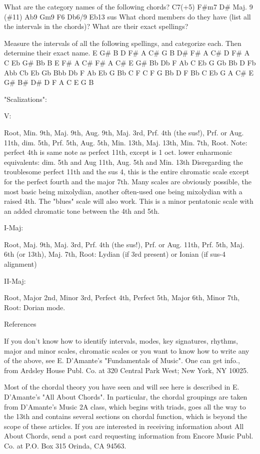 What are the category names of the following chords?
C7(+5) F\#m7 D\# Maj. 9 (\#11) Ab9 Gm9 F6 Db6/9 Eb13 sus
What chord members do they have (list all the intervals in the chords)?
What are their exact spellings?

Measure the intervals of all the following spellings, and categorize each.
Then determine their exact name.
E G\# B D F\# A C\#
G B D\# F\# A C\#
D F\# A C Eb G\# Bb
B E F\# A C\#
F\# A C\# E G\#
Bb Db F Ab C Eb G
Gb Bb D Fb Abb
Cb Eb Gb Bbb Db F Ab
Eb G Bb C F
C F G Bb D
F Bb C Eb G
A C\# E G\# B\# D\#
D F A C E G B

"Scalizations":

V:

Root, Min. 9th, Maj. 9th, Aug. 9th, Maj. 3rd, Prf. 4th (the sus!), 
Prf. or Aug. 11th, dim. 5th, Prf. 5th, Aug. 5th, Min. 13th, Maj. 13th,
Min. 7th, Root.
Note: perfect 4th is same note as perfect 11th, except is 1 oct. lower
      enharmonic equivalents: dim. 5th and Aug 11th, 
                              Aug. 5th and Min. 13th
Disregarding the troublesome perfect 11th and the sus 4, this is the
entire chromatic scale except for the perfect fourth and the 
major 7th. Many scales are obviously possible, the most basic being 
mixolydian, another often-used one being mixolydian with a raised 4th.
The "blues" scale will also work. This is a minor pentatonic scale with 
an added chromatic tone between the 4th and 5th.

I-Maj:

Root, Maj. 9th, Maj. 3rd, Prf. 4th (the sus!), Prf. or Aug. 11th,
Prf. 5th, Maj. 6th (or 13th), Maj. 7th, Root:
Lydian (if 3rd present) or Ionian (if sus-4 alignment)

II-Maj:

Root, Major 2nd, Minor 3rd, Perfect 4th, Perfect 5th,
Major 6th, Minor 7th, Root:
Dorian mode.

References

If you don't know how to identify intervals, modes, key signatures,
rhythms, major and minor scales, chromatic scales or you want to know
how to write any of the above, see E. D'Amante's "Fundamentals of Music".
One can get info., from Ardsley House Publ. Co. at 320 Central Park West;
New York, NY 10025.

Most of the chordal theory you have seen and will see here is described 
in E. D'Amante's "All About Chords". In particular, the chordal groupings
are taken from D'Amante's Music 2A class, which begins with triads, goes
all the way to the 13th and contains several sections on chordal function,
which is beyond the scope of these articles. If you are interested in
receiving information about All About Chords, send a post card requesting
information from Encore Music Publ. Co. at P.O. Box 315 Orinda, CA 94563.

